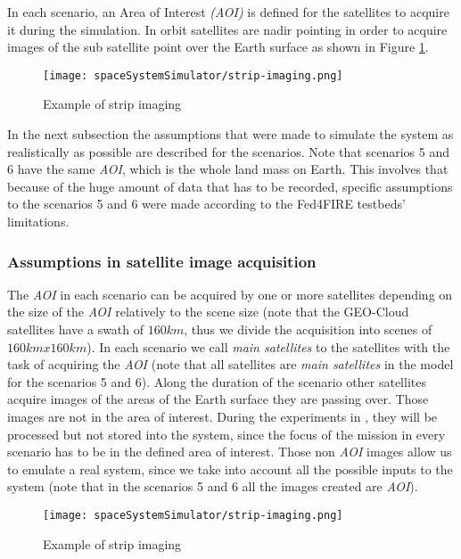 In each scenario, an Area of Interest \emph{(AOI)} is defined for the satellites to acquire it during the simulation. In orbit satellites are nadir pointing in order to acquire images of the sub satellite point over the Earth surface as shown in Figure \ref{fig:sss-example-strip}.
\begin{figure}[!h]
\begin{center}
\texttt{[image: spaceSystemSimulator/strip-imaging.png]}
\caption{Example of strip imaging}
\label{fig:sss-example-strip}
\end{center}
\end{figure}

In the next subsection the assumptions that were made to simulate the system as realistically as possible are described for the scenarios. Note that scenarios 5 and 6 have the same \emph{AOI}, which is the whole land mass on Earth. This involves that because of the huge amount of data that has to be recorded, specific assumptions to the scenarios 5 and 6 were made according to the Fed4FIRE testbeds’ limitations.

\subsubsection{Assumptions in satellite image acquisition}
\label{subsubsec:assumptions}

The \emph{AOI} in each scenario can be acquired by one or more satellites depending on
the size of the \emph{AOI} relatively to the scene size (note that the GEO-Cloud
satellites have a swath of $160km$, thus we divide the acquisition into scenes of
$160km x 160km$). 
In each scenario we call \emph{main satellites} to the satellites with the task
of acquiring the \emph{AOI} (note that all satellites are \emph{main satellites} in the
model for the scenarios 5 and 6). 
Along the duration of the scenario other satellites acquire images of the areas of the Earth surface they are passing over. Those images are not in the area of interest. During the experiments in \bonfire, they will be processed but not stored into the system, since the focus of the mission in every scenario has to be in the defined area of interest. Those non \emph{AOI} images allow us to emulate a real system, since we take into account all the possible inputs to the system (note that in the scenarios 5 and 6 all the images created are \emph{AOI}).

\begin{figure}[!h]
\begin{center}
\texttt{[image: spaceSystemSimulator/strip-imaging.png]}
\caption{Example of strip imaging}
\label{fig:sss-acquisition-diagram}
\end{center}
\end{figure}

